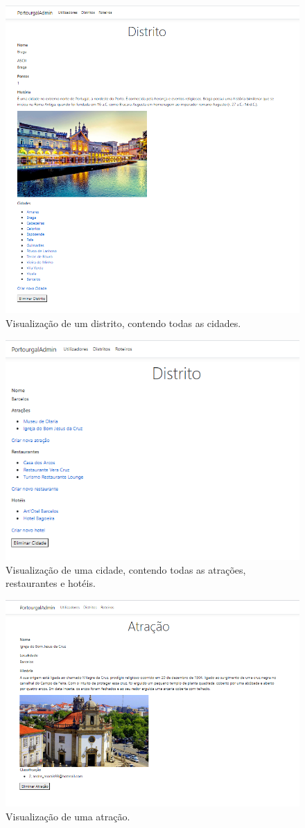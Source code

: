\begin{figure}[H]
\centering
\includegraphics[width=0.7\linewidth]{images/site_distrito.png}
\caption{Visualização de um distrito, contendo todas as cidades.}
\end{figure}

\begin{figure}[H]
\centering
\includegraphics[width=0.7\linewidth]{images/site_cidade.png}
\caption{Visualização de uma cidade, contendo todas as atrações, restaurantes e hotéis.}
\end{figure}

\begin{figure}[H]
\centering
\includegraphics[width=0.7\linewidth]{images/site_atracao.png}
\caption{Visualização de uma atração.}
\end{figure}

